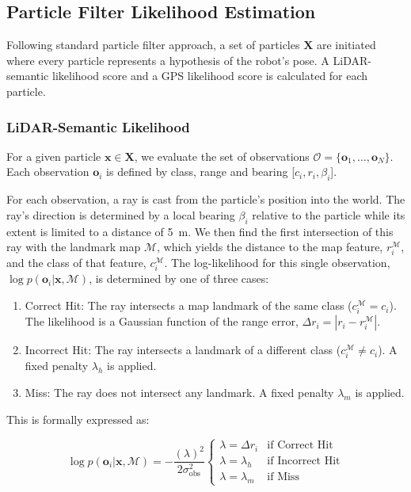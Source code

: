 \documentclass[letterpaper, 10 pt, conference]{ieeeconf}
\begin{document}
\subsection{Particle Filter Likelihood Estimation}
Following standard particle filter approach, a set of particles $\mathbf{X}$ are initiated where every particle represents a hypothesis of the robot's pose. A LiDAR-semantic likelihood score and a GPS likelihood score is calculated for each particle.

\subsubsection{LiDAR-Semantic Likelihood}
\label{sec:sem_like}
For a given particle $\mathbf{x} \in \mathbf{X}$, we evaluate the set of observations $\mathcal{O} = \{\mathbf{o}_1, \ldots, \mathbf{o}_N\}$. Each observation $\mathbf{o}_i$ is defined by class, range and bearing [$c_i, r_i, \beta_i$].

For each observation, a ray is cast from the particle's position into the world. The ray's direction is determined by a local bearing $\beta_i$ relative to the particle while its extent is limited to a distance of 5~m. We then find the first intersection of this ray with the landmark map $\mathcal{M}$, which yields the distance to the map feature, $r_i^{\mathcal{M}}$, and the class of that feature, $c_i^{\mathcal{M}}$. The log-likelihood for this single observation, $\log p(\mathbf{o}_i | \mathbf{x}, \mathcal{M})$, is determined by one of three cases:

\begin{enumerate}
    \item Correct Hit: The ray intersects a map landmark of the same class ($c_i^{\mathcal{M}} = c_i$). The likelihood is a Gaussian function of the range error, $\Delta r_i = \left| r_i - r_i^{\mathcal{M}}\right|$.
    \item Incorrect Hit: The ray intersects a landmark of a different class ($c_i^{\mathcal{M}} \neq c_i$). A fixed penalty $\lambda_h$ is applied.
    \item Miss: The ray does not intersect any landmark. A fixed penalty $\lambda_m$ is applied.
\end{enumerate}

This is formally expressed as:

\begin{equation}
\log p(\mathbf{o}_i | \mathbf{x}, \mathcal{M}) = -\frac{(\lambda)^2}{2\sigma_{\text{obs}}^2}
\begin{cases}
\lambda=\Delta r_i & \text{if Correct Hit} \\
\lambda=\lambda_h & \text{if Incorrect Hit} \\
\lambda=\lambda_m & \text{if Miss}
\end{cases}
\label{eq:cases}
\end{equation}
\end{document}
